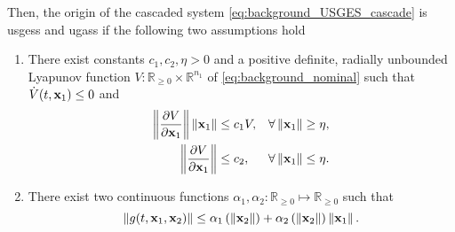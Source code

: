 \begin{prop}
    Then, the origin of the cascaded system \eqref{eq:background_USGES_cascade} is \glspl{usges} and \glspl{ugas} if the following two assumptions hold
    \begin{enumerate}
        \item There exist constants $c_1, c_2, \eta > 0$ and a positive definite, radially unbounded Lyapunov function $V : \mathbb{R}_{\geq 0} \times \mathbb{R}^{n_1}$ of \eqref{eq:background_nominal} such that $\dot{V}(t, \mathbf{x}_1) \leq 0$ and
        \begin{subequations}
            \begin{align}
                \left\|\frac{\partial V}{\partial \mathbf{x}_1}\right\| \left\|\mathbf{x}_1\right\| &\leq c_1 V,& \forall&\left\|\mathbf{x}_1\right\| \geq \eta, \\
                \left\|\frac{\partial V}{\partial \mathbf{x}_1}\right\| &\leq c_2,& \forall&\left\|\mathbf{x}_1\right\| \leq \eta.
            \end{align}
            \label{eq:background_USGES_cascade_assumption_1}
        \end{subequations}
        \item There exist two continuous functions $\alpha_1, \alpha_2: \mathbb{R}_{\geq 0} \mapsto \mathbb{R}_{\geq 0}$ such that
        \begin{equation}
            \left\|g(t, \mathbf{x}_1, \mathbf{x}_2)\right\| \leq \alpha_1 \left(\left\|\mathbf{x}_2\right\|\right) + \alpha_2 \left(\left\|\mathbf{x}_2\right\|\right) \left\|\mathbf{x}_1\right\|.
            \label{eq:background_USGES_cascade_assumption_2}
        \end{equation}
    \end{enumerate}
\end{prop}
